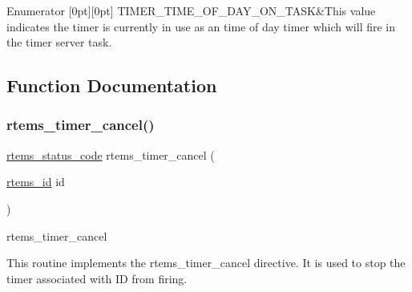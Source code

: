 \begin{DoxyEnumFields}{Enumerator}
[0pt][0pt]{}\mbox{\label{group__ClassicTimer_ggaca88ac1e833f63ec72d38e07677f2f27a6cbfcb761548cc060f4e46daff1e2d29}} 
T\+I\+M\+E\+R\+\_\+\+T\+I\+M\+E\+\_\+\+O\+F\+\_\+\+D\+A\+Y\+\_\+\+O\+N\+\_\+\+T\+A\+SK&This value indicates the timer is currently in use as an time of day timer which will fire in the timer server task. \\
\hline

\end{DoxyEnumFields}


\subsection{Function Documentation}
\mbox{\label{group__ClassicTimer_ga746671597de779ad02b9ca72facc9e92}} 
\subsubsection{\texorpdfstring{rtems\_timer\_cancel()}{rtems\_timer\_cancel()}}
{\footnotesize\ttfamily \mbox{\hyperlink{group__ClassicStatus_ga545d41846817eaba6143d52ee4d9e9fe}{rtems\+\_\+status\+\_\+code}} rtems\+\_\+timer\+\_\+cancel (\begin{DoxyParamCaption}\item[{\mbox{\hyperlink{group__ClassicTasks_gab20892b814dced7dd4e5b9bf42becd57}{rtems\+\_\+id}}}]{id }\end{DoxyParamCaption})}



rtems\+\_\+timer\+\_\+cancel 

This routine implements the rtems\+\_\+timer\+\_\+cancel directive. It is used to stop the timer associated with ID from firing. \mbox{\label{group__ClassicTimer_ga57cf664e958961aefdb8ef8440f23afa}} 
